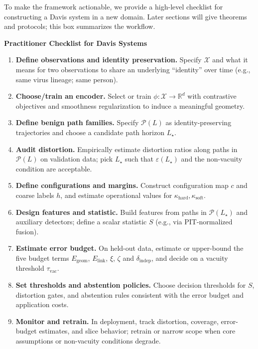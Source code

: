 \documentclass[11pt]{article}
\theoremstyle{remark}
\theoremstyle{plain}
\begin{document}
To make the framework actionable, we provide a high-level checklist for constructing a
Davis system in a new domain. Later sections will give theorems and protocols; this box
summarizes the workflow.

\begin{mdframed}[linewidth=0.5pt]
\noindent\textbf{Practitioner Checklist for Davis Systems}
\begin{enumerate}[leftmargin=*]
    \item \textbf{Define observations and identity preservation.} Specify $\mathcal{X}$ and what it
    means for two observations to share an underlying ``identity'' over time (e.g., same virus
    lineage; same person).

    \item \textbf{Choose/train an encoder.} Select or train $\phi:\mathcal{X}\to\mathbb{R}^d$
    with contrastive objectives and smoothness regularization to induce a meaningful geometry.

    \item \textbf{Define benign path families.} Specify $\mathcal{P}(L)$ as identity-preserving
    trajectories and choose a candidate path horizon $L_\star$.

    \item \textbf{Audit distortion.} Empirically estimate distortion ratios along paths in
    $\mathcal{P}(L)$ on validation data; pick $L_\star$ such that $\varepsilon(L_\star)$ and the
    non-vacuity condition are acceptable.

    \item \textbf{Define configurations and margins.} Construct configuration map $c$ and coarse
    labels $h$, and estimate operational values for $\kappa_{\mathrm{hard}},\kappa_{\mathrm{soft}}$.

    \item \textbf{Design features and statistic.} Build features from paths in $\mathcal{P}(L_\star)$
    and auxiliary detectors; define a scalar statistic $S$ (e.g., via PIT-normalized fusion).

    \item \textbf{Estimate error budget.} On held-out data, estimate or upper-bound the five budget terms
    $E_{\text{geom}}$, $E_{\text{link}}$, $\xi$, $\zeta$ and $\delta_{\text{indep}}$, and decide on a vacuity
    threshold $\tau_{\text{vac}}$.

    \item \textbf{Set thresholds and abstention policies.} Choose decision thresholds for $S$,
    distortion gates, and abstention rules consistent with the error budget and application costs.

    \item \textbf{Monitor and retrain.} In deployment, track distortion, coverage, error-budget
    estimates, and slice behavior; retrain or narrow scope when core assumptions or non-vacuity
    conditions degrade.
\end{enumerate}
\end{mdframed}
\end{document}
